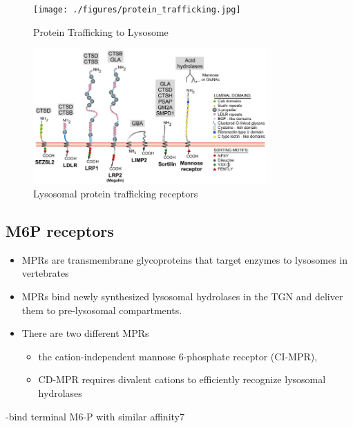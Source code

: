 \documentclass{scrartcl}
\begin{document}
\begin{figure}[htbp]
\centering
\texttt{[image: ./figures/protein\_trafficking.jpg]}
\caption{\label{fig:orgc329044}
Protein Trafficking to Lysosome}
\end{figure}

\begin{figure}[htbp]
\centering
\includegraphics[width=0.8\textwidth]{./figures/lysosome_trafficking.jpeg}
\caption[Lysosomal protein trafficking receptors]{\label{fig:org41274f1}
Lysosomal protein trafficking receptors}
\end{figure}


\subsection{M6P receptors}
\label{sec:org5ee2783}
\begin{itemize}
\item MPRs are transmembrane glycoproteins that target enzymes to lysosomes in vertebrates
\item MPRs bind newly synthesized lysosomal hydrolases in the TGN and deliver them to pre-lysosomal compartments.
\item There are two different MPRs
\begin{itemize}
\item the cation-independent mannose 6-phosphate receptor (CI-MPR),
\item CD-MPR requires divalent cations to efficiently recognize lysosomal hydrolases
\end{itemize}
\end{itemize}
-bind terminal M6-P with similar affinity7
\end{document}
